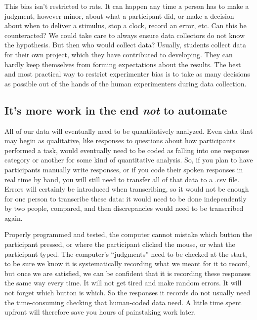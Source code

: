 \documentclass[12pt,]{book}
\theoremstyle{definition}
\theoremstyle{definition}
\theoremstyle{definition}
\theoremstyle{remark}
\begin{document}
This bias isn't restricted to rats. It can happen any time a person has
to make a judgment, however minor, about what a participant did, or make
a decision about when to deliver a stimulus, stop a clock, record an
error, etc. Can this be counteracted? We could take care to always
ensure data collectors do not know the hypothesis. But then who would
collect data? Usually, students collect data for their own project,
which they have contributed to developing. They can hardly keep
themselves from forming expectations about the results. The best and
most practical way to restrict experimenter bias is to take as many
decisions as possible out of the hands of the human experimenters during
data collection.

\subsection{\texorpdfstring{It's more work in the end \emph{not} to
automate}{It's more work in the end not to automate}}\label{its-more-work-in-the-end-not-to-automate}

All of our data will eventually need to be quantitatively analyzed. Even
data that may begin as qualitative, like responses to questions about
how participants performed a task, would eventually need to be coded as
falling into one response category or another for some kind of
quantitative analysis. So, if you plan to have participants manually
write responses, or if you code their spoken responses in real time by
hand, you will still need to transfer all of that data to a .csv file.
Errors will certainly be introduced when transcribing, so it would not
be enough for one person to transcribe these data: it would need to be
done independently by two people, compared, and then discrepancies would
need to be transcribed again.

Properly programmed and tested, the computer cannot mistake which button
the participant pressed, or where the participant clicked the mouse, or
what the participant typed. The computer's ``judgments'' need to be
checked at the start, to be sure we know it is systematically recording
what we meant for it to record, but once we are satisfied, we can be
confident that it is recording these responses the same way every time.
It will not get tired and make random errors. It will not forget which
button is which. So the responses it records do not usually need the
time-consuming checking that human-coded data need. A little time spent
upfront will therefore save you hours of painstaking work later.
\end{document}
